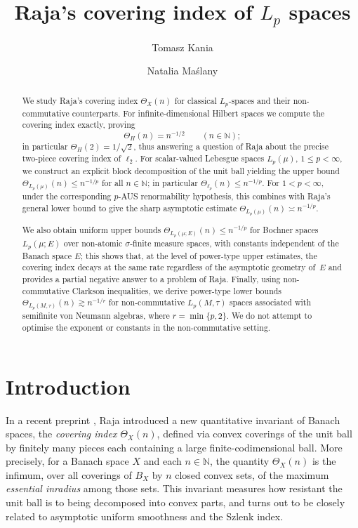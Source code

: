 \documentclass[reqno,11pt]{amsart}
\title[Raja's covering index of $L_p$ spaces]%
{Raja's covering index of $L_p$ spaces}
\author[T.~Kania]{Tomasz Kania}
\author[N.~Ma\'slany]{Natalia Ma\'slany}
\theoremstyle{plain}
\theoremstyle{definition}
\theoremstyle{remark}
\newcommand{\elltwo}{\ell_2}
\renewcommand{\le}{\leqslant}
\begin{document}
\maketitle

\begin{abstract}
We study Raja's covering index $\Theta_X(n)$ for classical $L_p$-spaces and their non-commutative counterparts.  
For infinite-dimensional Hilbert spaces we compute the covering index exactly, proving
\[
\Theta_H(n)=n^{-1/2}\qquad(n\in\mathbb N);
\]
in particular $\Theta_H(2)=1/\sqrt2$, thus answering a question of Raja about the precise two-piece covering index of $\elltwo$.  
For scalar-valued Lebesgue spaces $L_p(\mu)$, $1\le p<\infty$, we construct an explicit block decomposition of the unit ball yielding the upper bound $\Theta_{L_p(\mu)}(n)\le n^{-1/p}$ for all $n\in\mathbb{N}$; in particular $\Theta_{\ell_p}(n)\le n^{-1/p}$.  
For $1<p<\infty$, under the corresponding $p$-AUS renormability hypothesis, this combines with Raja's general lower bound to give the sharp asymptotic estimate $\Theta_{L_p(\mu)}(n)\asymp n^{-1/p}$.  

We also obtain uniform upper bounds $\Theta_{L_p(\mu;E)}(n)\le n^{-1/p}$ for Bochner spaces $L_p(\mu;E)$ over non-atomic $\sigma$-finite measure spaces, with constants independent of the Banach space $E$; this shows that, at the level of power-type upper estimates, the covering index decays at the same rate regardless of the asymptotic geometry of~$E$ and provides a partial negative answer to a problem of Raja.  
Finally, using non-commutative Clarkson inequalities, we derive power-type lower bounds $\Theta_{L_p(M,\tau)}(n)\gtrsim n^{-1/r}$ for non-commutative $L_p(M,\tau)$ spaces associated with semifinite von Neumann algebras, where $r=\min\{p,2\}$.  We do not attempt to optimise the exponent or constants in the non-commutative setting.
\end{abstract}

\section*{Introduction}

In a recent preprint \cite{RajaCoveringIndex}, Raja introduced a new quantitative invariant of Banach spaces, the \emph{covering index} $\Theta_X(n)$, defined via convex coverings of the unit ball by finitely many pieces each containing a large finite-codimensional ball.  More precisely, for a Banach space $X$ and each $n\in\mathbb{N}$, the quantity $\Theta_X(n)$ is the infimum, over all coverings of $B_X$ by $n$ closed convex sets, of the maximum \emph{essential inradius} among those sets.  This invariant measures how resistant the unit ball is to being decomposed into convex parts, and turns out to be closely related to asymptotic uniform smoothness and the Szlenk index.
\end{document}

